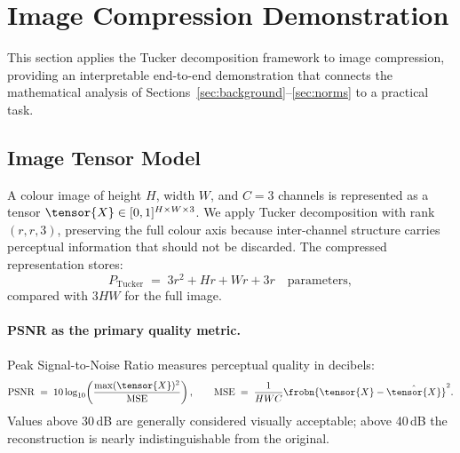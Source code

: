 
\section{Image Compression Demonstration}
\label{sec:demo}

This section applies the Tucker decomposition framework to image compression,
providing an interpretable end-to-end demonstration that connects the
mathematical analysis of Sections~\ref{sec:background}--\ref{sec:norms}
to a practical task.

\subsection{Image Tensor Model}
\label{subsec:image_model}

A colour image of height $H$, width $W$, and $C=3$ channels is
represented as a tensor $\tensor{X} \in [0,1]^{H \times W \times 3}$.
We apply Tucker decomposition with rank $(r, r, 3)$, preserving the full
colour axis because inter-channel structure carries perceptual information
that should not be discarded.
The compressed representation stores:
\begin{equation}
  P_{\mathrm{Tucker}}
  \;=\; 3r^2 + Hr + Wr + 3r
  \quad \text{parameters},
  \label{eq:image_params}
\end{equation}
compared with $3HW$ for the full image.

\paragraph{PSNR as the primary quality metric.}
Peak Signal-to-Noise Ratio measures perceptual quality in decibels:
\begin{equation}
  \mathrm{PSNR}
  \;=\; 10\log_{10}\!\left(
          \frac{\max(\tensor{X})^2}{\mathrm{MSE}}
        \right),
  \qquad
  \mathrm{MSE}
  \;=\; \frac{1}{HWC}
        \frobn{\tensor{X} - \hat{\tensor{X}}}^2.
  \label{eq:psnr}
\end{equation}
Values above 30\,dB are generally considered visually acceptable;
above 40\,dB the reconstruction is nearly indistinguishable from the original.

